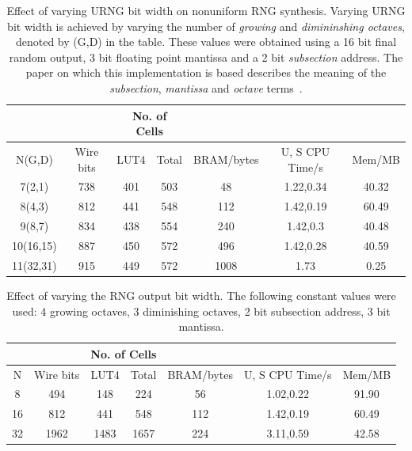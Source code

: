 \documentclass[12pt]{article}
\begin{document}
      \begin{table}[H]
        \centering
        \begin{tabular}{|c||c|c|c|c|c|c|}
          \hline
          &  & \multicolumn{2}{|c|}{No. of Cells} & & &\\
          \hline
          N(G,D) & Wire bits & LUT4 & Total & BRAM/bytes & U, S CPU Time/s & Mem/MB\\
          \hline
          \hline
          7(2,1) & 738 & 401 & 503 & 48 & 1.22,0.34 & 40.32\\
          \hline
          8(4,3) & 812 & 441 & 548 & 112 & 1.42,0.19 & 60.49\\
          \hline
          9(8,7) & 834 & 438 & 554 & 240 & 1.42,0.3 & 40.48\\
          \hline
          10(16,15) & 887 & 450 & 572 & 496 & 1.42,0.28 & 40.59\\
          \hline
          11(32,31) & 915 & 449 & 572 & 1008 & 1.73 & 0.25\\
          \hline
        \end{tabular}
        \caption{Effect of varying URNG bit width on nonuniform RNG synthesis. Varying URNG bit width is achieved by varying the number of \textit{growing} and \textit{dimininshing octaves}, denoted by (G,D) in the table. These values were obtained using a 16 bit final random output, 3 bit floating point mantissa and a 2 bit \textit{subsection} address. The paper on which this implementation is based describes the meaning of the \textit{subsection}, \textit{mantissa} and \textit{octave} terms~\cite{DeSchryver}.}
        \label{table:rng_bx}
      \end{table}

      \begin{table}[H]
        \centering
        \begin{tabular}{|c||c|c|c|c|c|c|}
          \hline
          &  & \multicolumn{2}{|c|}{No. of Cells} & & &\\
          \hline
          N & Wire bits & LUT4 & Total & BRAM/bytes & U, S CPU Time/s & Mem/MB\\
          \hline
          \hline
          8 & 494 & 148 & 224 & 56 & 1.02,0.22 & 91.90\\
          \hline
          16 & 812 & 441 & 548 & 112 & 1.42,0.19 & 60.49\\
          \hline
          32 & 1962 & 1483 & 1657 & 224 & 3.11,0.59 & 42.58\\
          \hline
        \end{tabular}
        \caption{Effect of varying the RNG output bit width. The following constant values were used: 4 growing octaves, 3 diminishing octaves, 2 bit subsection address, 3 bit mantissa.}
        \label{table:rng_by}
      \end{table}
\end{document}

